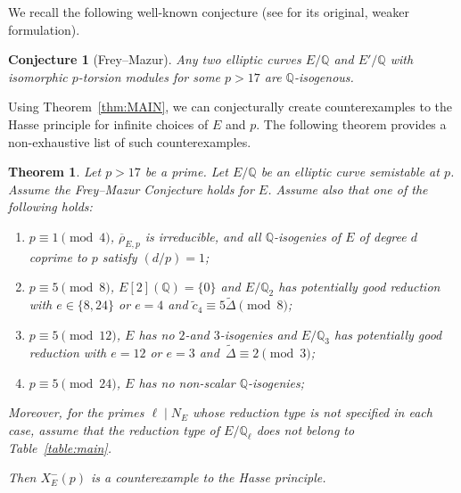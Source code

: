\documentclass[12pt]{amsart}
\numberwithin{equation}{section}
\newtheorem{theorem}[equation]{Theorem}
\newtheorem{conj}[equation]{Conjecture}
\theoremstyle{definition}
\newcommand{\Q}{\mathbb{Q}}
\newcommand{\rhobar}{{\overline{\rho}}}
\begin{document}
We recall the following well-known conjecture (see \cite{FreyMazur} for its original, weaker formulation).
\begin{conj}[Frey--Mazur] \label{conj:FM}
Any two elliptic curves $E/\Q$ and $E'/\Q$ with isomorphic $p$-torsion modules for some $p > 17$ are $\Q$-isogenous.
\end{conj}
Using Theorem~\ref{thm:MAIN}, we can conjecturally create counterexamples to the Hasse principle for infinite choices of $E$ and $p$. The following theorem provides a non-exhaustive list of such counterexamples.
\begin{theorem} \label{thm:Frey-Mazur}
    Let $p>17$ be a prime. Let $E/\Q$ be an elliptic curve semistable at $p$. Assume the Frey--Mazur Conjecture holds for $E$. Assume also that one of the following holds: 
   \begin{enumerate}
    \item $p \equiv 1 \pmod{4}$, $\rhobar_{E,p}$  is irreducible, and all $\Q$-isogenies of $E$ of degree $d$ coprime to $p$ satisfy $(d/p)=1$;
    \item $p \equiv 5 \pmod{8}$, $E[2](\Q) =\{0\}$ and $E/\Q_2$ has potentially good reduction with $e \in \{8,24\}$ or $e=4$ and $\tilde{c}_4\equiv 5\tilde{\Delta} \pmod{8}$;
    \item $p \equiv 5 \pmod{12}$, $E$ has no $2$-and $3$-isogenies and $E/\Q_3$ has potentially good reduction with
    $e =12$ or $e=3$ and~$\tilde{\Delta} \equiv 2 \pmod{3}$;
    \item $p \equiv 5 \pmod{24}$, $E$ has no non-scalar $\Q$-isogenies;
   \end{enumerate}
   Moreover, for the primes $\ell \mid N_E$ whose reduction type is not specified in each case, assume that the reduction type of $E/\Q_\ell$ does not belong to Table~\ref{table:main}. 
   
   Then $X_E^-(p)$ is a counterexample to the Hasse principle.
\end{theorem}
\end{document}
